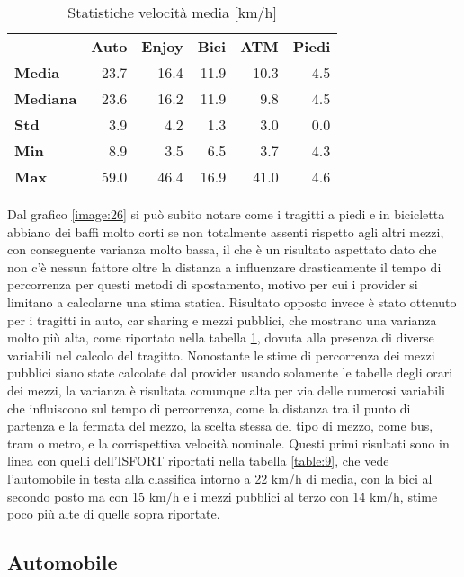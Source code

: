 \begin{table}[H]
\centering
\begin{tabular}{ | l r r r r r | }
\hline
& \textbf{Auto} & \textbf{Enjoy} & \textbf{Bici} & \textbf{ATM} & \textbf{Piedi} \\
\textbf{Media}      & 23.7 & 16.4 & 11.9 & 10.3 & 4.5 \\
\textbf{Mediana} & 23.6 & 16.2 & 11.9 &   9.8 & 4.5 \\
\textbf{Std}             &  3.9 &   4.2 &   1.3 &    3.0 & 0.0 \\
\textbf{Min}            &  8.9 &   3.5 &   6.5 &    3.7 & 4.3 \\
\textbf{Max}         & 59.0 & 46.4 & 16.9 &  41.0 & 4.6 \\
\hline
\end{tabular}
\caption{Statistiche velocità media [km/h]}
\label{table:3}
\end{table}

Dal grafico \ref{image:26} si può subito notare come i tragitti a piedi e in bicicletta abbiano dei baffi molto corti se non totalmente assenti rispetto agli altri mezzi, con conseguente varianza molto bassa, il che è un risultato aspettato dato che non c'è nessun fattore oltre la distanza a influenzare drasticamente il tempo di percorrenza per questi metodi di spostamento, motivo per cui i provider si limitano a calcolarne una stima statica. Risultato opposto invece è stato ottenuto per i tragitti in auto, car sharing e mezzi pubblici, che mostrano una varianza molto più alta, come riportato nella tabella \ref{table:3}, dovuta alla presenza di diverse variabili nel calcolo del tragitto. Nonostante le stime di percorrenza dei mezzi pubblici siano state calcolate dal provider usando solamente le tabelle degli orari dei mezzi, la varianza è risultata comunque alta per via delle numerosi variabili che influiscono sul tempo di percorrenza, come la distanza tra il punto di partenza e la fermata del mezzo, la scelta stessa del tipo di mezzo, come bus, tram o metro, e la corrispettiva velocità nominale. Questi primi risultati sono in linea con quelli dell'ISFORT riportati nella tabella \ref{table:9}, che vede l'automobile in testa alla classifica intorno a 22 km/h di media, con la bici al secondo posto ma con 15 km/h e i mezzi pubblici al terzo con 14 km/h, stime poco più alte di quelle sopra riportate.

\subsection{Automobile}

